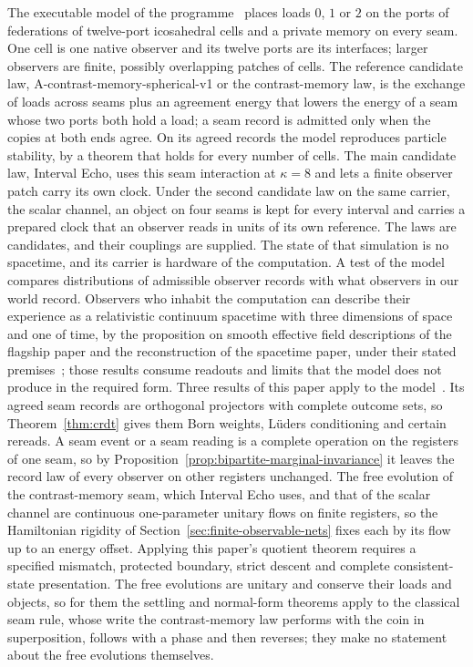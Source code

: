\documentclass[11pt]{article}
\theoremstyle{remark}
\theoremstyle{plain}
\begin{document}
The executable model of the programme~\cite{ophmodel} places loads $0$,
$1$ or $2$ on the ports of federations of twelve-port icosahedral cells and
a private memory on every seam. One cell is one native observer and its
twelve ports are its interfaces; larger observers are finite, possibly
overlapping patches of cells. The reference candidate law,
A-contrast-memory-spherical-v1 or the contrast-memory law, is the exchange
of loads across seams plus an agreement energy that lowers the energy of a
seam whose two ports both hold a load; a seam record is admitted only when
the copies at both ends agree. On its agreed records the model reproduces
particle stability, by a theorem that holds for every number of cells. The
main candidate law, Interval Echo, uses this seam interaction at
$\kappa=8$ and lets a finite observer patch carry its own clock. Under the
second candidate law on the same carrier, the scalar channel, an object on
four seams is kept for every interval and carries a prepared clock that an
observer reads in units of its own reference. The laws are candidates, and
their couplings are supplied. The state of that simulation
is no spacetime, and its carrier is hardware of the computation. A test of
the model compares distributions of admissible observer records with what
observers in our world record. Observers who inhabit the computation can
describe their experience as a relativistic continuum spacetime with three
dimensions of space and one of time, by the proposition on smooth effective
field descriptions of the flagship paper and the reconstruction of the
spacetime paper, under their stated premises~\cite{ophsynthesis,ophEinstein};
those results consume readouts and limits that the model does not produce in
the required form. Three results of this paper apply to the
model~\cite{ophmodel}. Its agreed seam records are orthogonal projectors
with complete outcome sets, so Theorem~\ref{thm:crdt} gives them Born
weights, L\"uders conditioning and certain rereads. A seam event or a seam
reading is a complete operation on the registers of one seam, so by
Proposition~\ref{prop:bipartite-marginal-invariance} it leaves the record
law of every observer on other registers unchanged. The free evolution of
the contrast-memory seam, which Interval Echo uses, and that of the scalar
channel are continuous one-parameter unitary flows on finite registers, so
the Hamiltonian rigidity of Section~\ref{sec:finite-observable-nets} fixes
each by its flow up to an energy offset. Applying this paper's quotient
theorem requires a specified mismatch, protected boundary, strict descent
and complete consistent-state presentation. The free evolutions are unitary
and conserve their loads and objects, so for them the settling and
normal-form theorems apply to the classical seam rule, whose write the
contrast-memory law performs with the coin in superposition, follows with a
phase and then reverses; they make no statement about the free evolutions
themselves.
\end{document}
